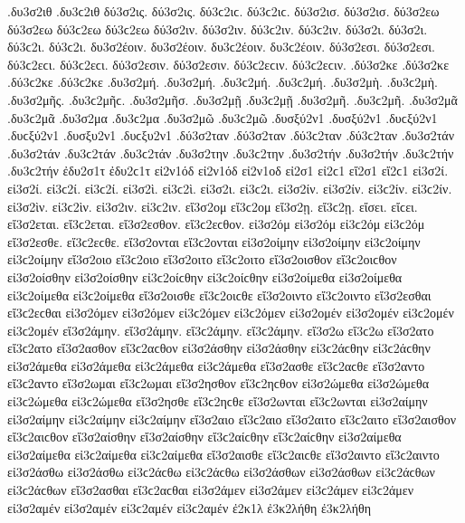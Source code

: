 {.δυ3σ2ιθ .δυ3ϲ2ιθ   %
δύ3σ2ις. δύ3σ2ις. δύ3ϲ2ιϲ. δύ3ϲ2ιϲ.   %
δύ3σ2ισ. δύ3σ2ισ.
δύ3σ2εω δύ3σ2εω δύ3ϲ2εω δύ3ϲ2εω
δύ3σ2ιν. δύ3σ2ιν. δύ3ϲ2ιν. δύ3ϲ2ιν.
δύ3σ2ι. δύ3σ2ι. δύ3ϲ2ι. δύ3ϲ2ι.
δυ3σ2έοιν. δυ3σ2έοιν. δυ3ϲ2έοιν. δυ3ϲ2έοιν.
δύ3σ2εσι. δύ3σ2εσι. δύ3ϲ2εϲι. δύ3ϲ2εϲι.
δύ3σ2εσιν. δύ3σ2εσιν. δύ3ϲ2εϲιν. δύ3ϲ2εϲιν.
.δύ3σ2κε .δύ3σ2κε .δύ3ϲ2κε .δύ3ϲ2κε   %
.δυ3σ2μή. .δυ3σ2μή. .δυ3ϲ2μή. .δυ3ϲ2μή.   %
.δυ3σ2μὴ. .δυ3ϲ2μὴ.
.δυ3σ2μῆς. .δυ3ϲ2μῆϲ.
.δυ3σ2μῆσ.
.δυ3σ2μῇ .δυ3ϲ2μῇ
.δυ3σ2μῆ. .δυ3ϲ2μῆ.
.δυ3σ2μᾶ .δυ3ϲ2μᾶ
.δυ3σ2μα .δυ3ϲ2μα
.δυ3σ2μῶ .δυ3ϲ2μῶ
.δυσξύ2ν1 .δυσξύ2ν1 .δυϲξύ2ν1 .δυϲξύ2ν1   %
.δυσξυ2ν1 .δυϲξυ2ν1
.δύ3σ2ταν .δύ3σ2ταν .δύ3ϲ2ταν .δύ3ϲ2ταν   %
.δυ3σ2τάν .δυ3σ2τάν .δυ3ϲ2τάν .δυ3ϲ2τάν
.δυ3σ2την .δυ3ϲ2την   %
.δυ3σ2τήν .δυ3σ2τήν .δυ3ϲ2τήν .δυ3ϲ2τήν
ἐδυ2σ1τ ἐδυ2ϲ1τ   %
εἰ2ν1όδ εἰ2ν1όδ   %
εἰ2ν1οδ
εἰ2σ1 εἰ2ϲ1   %
εἴ2σ1 εἴ2ϲ1
εἰ3σ2ί. εἰ3σ2ί. εἰ3ϲ2ί. εἰ3ϲ2ί.   %
εἰ3σ2ὶ. εἰ3ϲ2ὶ.
εἰ3σ2ι. εἰ3ϲ2ι.
εἰ3σ2ίν. εἰ3σ2ίν. εἰ3ϲ2ίν. εἰ3ϲ2ίν.
εἰ3σ2ὶν. εἰ3ϲ2ὶν.
εἰ3σ2ιν. εἰ3ϲ2ιν.
εἴ3σ2ομ εἴ3ϲ2ομ   %
εἴ3σ2ῃ. εἴ3ϲ2ῃ. εἴσει. εἴϲει.
εἴ3σ2εται. εἴ3ϲ2εται.
εἴ3σ2εσθον. εἴ3ϲ2εϲθον.
εἰ3σ2όμ εἰ3σ2όμ εἰ3ϲ2όμ εἰ3ϲ2όμ   %
εἴ3σ2εσθε. εἴ3ϲ2εϲθε.
εἴ3σ2ονται εἴ3ϲ2ονται
%
εἰ3σ2οίμην εἰ3σ2οίμην εἰ3ϲ2οίμην εἰ3ϲ2οίμην
εἴ3σ2οιο εἴ3ϲ2οιο
εἴ3σ2οιτο εἴ3ϲ2οιτο
εἴ3σ2οισθον εἴ3ϲ2οιϲθον
εἰ3σ2οίσθην εἰ3σ2οίσθην εἰ3ϲ2οίϲθην εἰ3ϲ2οίϲθην
εἰ3σ2οίμεθα εἰ3σ2οίμεθα εἰ3ϲ2οίμεθα εἰ3ϲ2οίμεθα
εἴ3σ2οισθε εἴ3ϲ2οιϲθε
εἴ3σ2οιντο εἴ3ϲ2οιντο
%
εἴ3σ2εσθαι εἴ3ϲ2εϲθαι
εἰ3σ2όμεν εἰ3σ2όμεν εἰ3ϲ2όμεν εἰ3ϲ2όμεν   %
εἰ3σ2ομέν εἰ3σ2ομέν εἰ3ϲ2ομέν εἰ3ϲ2ομέν
%
εἴ3σ2άμην. εἴ3σ2άμην. εἴ3ϲ2άμην. εἴ3ϲ2άμην.
εἴ3σ2ω εἴ3ϲ2ω
εἴ3σ2ατο εἴ3ϲ2ατο
εἴ3σ2ασθον εἴ3ϲ2αϲθον
εἰ3σ2άσθην εἰ3σ2άσθην εἰ3ϲ2άϲθην εἰ3ϲ2άϲθην
εἰ3σ2άμεθα εἰ3σ2άμεθα εἰ3ϲ2άμεθα εἰ3ϲ2άμεθα
εἴ3σ2ασθε εἴ3ϲ2αϲθε
εἴ3σ2αντο εἴ3ϲ2αντο
%
εἴ3σ2ωμαι εἴ3ϲ2ωμαι
εἴ3σ2ησθον εἴ3ϲ2ηϲθον
εἰ3σ2ώμεθα εἰ3σ2ώμεθα εἰ3ϲ2ώμεθα εἰ3ϲ2ώμεθα
εἴ3σ2ησθε εἴ3ϲ2ηϲθε
εἴ3σ2ωνται εἴ3ϲ2ωνται
%
εἰ3σ2αίμην εἰ3σ2αίμην εἰ3ϲ2αίμην εἰ3ϲ2αίμην
εἴ3σ2αιο εἴ3ϲ2αιο
εἴ3σ2αιτο εἴ3ϲ2αιτο
εἴ3σ2αισθον εἴ3ϲ2αιϲθον
εἴ3σ2αίσθην εἴ3σ2αίσθην εἴ3ϲ2αίϲθην εἴ3ϲ2αίϲθην
εἰ3σ2αίμεθα εἰ3σ2αίμεθα εἰ3ϲ2αίμεθα εἰ3ϲ2αίμεθα
εἴ3σ2αισθε εἴ3ϲ2αιϲθε
εἴ3σ2αιντο εἴ3ϲ2αιντο
%
εἰ3σ2άσθω εἰ3σ2άσθω εἰ3ϲ2άϲθω εἰ3ϲ2άϲθω
εἰ3σ2άσθων εἰ3σ2άσθων εἰ3ϲ2άϲθων εἰ3ϲ2άϲθων
%
εἴ3σ2ασθαι εἴ3ϲ2αϲθαι
εἰ3σ2άμεν εἰ3σ2άμεν εἰ3ϲ2άμεν εἰ3ϲ2άμεν   %
εἰ3σ2αμέν εἰ3σ2αμέν εἰ3ϲ2αμέν εἰ3ϲ2αμέν
%
ἐ2κ1λ   %
ἐ3κ2λήθη ἐ3κ2λήθη   %
}
